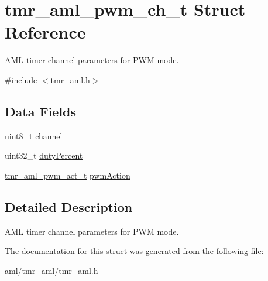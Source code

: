 \hypertarget{structtmr__aml__pwm__ch__t}{}\section{tmr\+\_\+aml\+\_\+pwm\+\_\+ch\+\_\+t Struct Reference}
\label{structtmr__aml__pwm__ch__t}


A\+ML timer channel parameters for P\+WM mode.  




{\ttfamily \#include $<$tmr\+\_\+aml.\+h$>$}

\subsection*{Data Fields}
\begin{DoxyCompactItemize}
\item 
uint8\+\_\+t \mbox{\hyperlink{group__globals__group_ga715f5cb061d11eb75981741eda4dafcd}{channel}}
\item 
uint32\+\_\+t \mbox{\hyperlink{group__globals__group_gac5d6008f628917520f517667b6ff290f}{duty\+Percent}}
\item 
\mbox{\hyperlink{group__enum__group_ga6ce2dec1c04ab59872ebaf44bd4f4682}{tmr\+\_\+aml\+\_\+pwm\+\_\+act\+\_\+t}} \mbox{\hyperlink{group__globals__group_gaf500180d9ca339fd69d69b52db442b74}{pwm\+Action}}
\end{DoxyCompactItemize}


\subsection{Detailed Description}
A\+ML timer channel parameters for P\+WM mode. 

The documentation for this struct was generated from the following file\+:\begin{DoxyCompactItemize}
\item 
aml/tmr\+\_\+aml/\mbox{\hyperlink{tmr__aml_8h}{tmr\+\_\+aml.\+h}}\end{DoxyCompactItemize}
